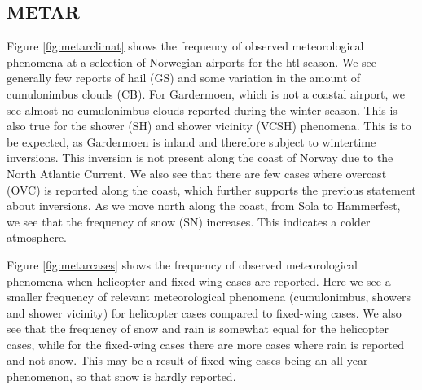 \subsection{METAR}
Figure \ref{fig:metarclimat} shows the frequency of observed meteorological phenomena at a selection of Norwegian airports for the \acrshort{htl}-season. We see generally few reports of hail (GS) and some variation in the amount of cumulonimbus clouds (CB). For Gardermoen, which is not a coastal airport, we see almost no cumulonimbus clouds reported during the winter season. This is also true for the shower (SH) and shower vicinity (VCSH) phenomena. This is to be expected, as Gardermoen is inland and therefore subject to wintertime inversions. This inversion is not present along the coast of Norway due to the North Atlantic Current. We also see that there are few cases where overcast (OVC) is reported along the coast, which further supports the previous statement about inversions. As we move north along the coast, from Sola to Hammerfest, we see that the frequency of snow (SN) increases. This indicates a colder atmosphere.



Figure \ref{fig:metarcases} shows the frequency of observed meteorological phenomena when helicopter and fixed-wing cases are reported. Here we see a smaller frequency of relevant meteorological phenomena (cumulonimbus, showers and shower vicinity) for helicopter cases compared to fixed-wing cases. We also see that the frequency of snow and rain is somewhat equal for the helicopter cases, while for the fixed-wing cases there are more cases where rain is reported and not snow. This may be a result of fixed-wing cases being an all-year phenomenon, so that snow is hardly reported.

